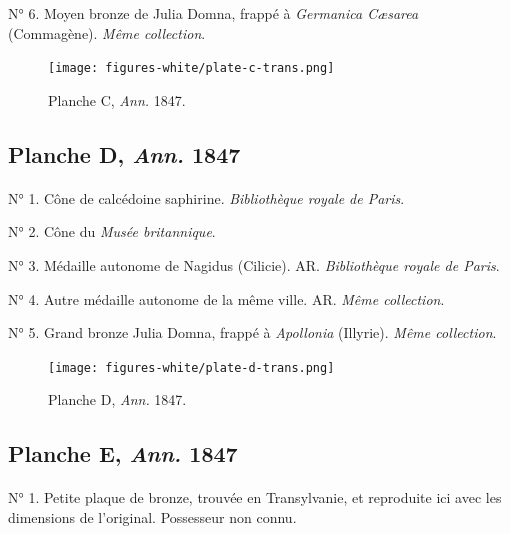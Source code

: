 \documentclass[a4paper, 11pt, oneside, polutonikogreek, french]{article}
\begin{document}
N° 6. Moyen bronze de Julia Domna, frappé à \emph{Germanica Cæsarea} (Commagène). \emph{Même collection}.
\vspace*{\fill}
\clearpage
\pagestyle{fancy}
\fancyhf{}
\cfoot{{\tiny\bfseries\thepage}}
\vspace*{\fill}
\begin{figure}[H]
\centering
\texttt{[image: figures-white/plate-c-trans.png]}
\caption{\scriptsize Planche C, \emph{Ann.} 1847.}
\end{figure}
\vspace*{\fill}
\clearpage
\pagestyle{plain}
\cfoot{{\tiny\bfseries\thepage}}
\vspace*{\fill}
\subsection{Planche D, \emph{Ann.} 1847}
\paragraph{}
N° 1. Cône de calcédoine saphirine. \emph{Bibliothèque royale de Paris}.

N° 2. Cône du \emph{Musée britannique}.

N° 3. Médaille autonome de Nagidus (Cilicie). AR. \emph{Bibliothèque royale de Paris}.

N° 4. Autre médaille autonome de la même ville. AR. \emph{Même collection}.

N° 5. Grand bronze Julia Domna, frappé à \emph{Apollonia} (Illyrie). \emph{Même collection}.
\vspace*{\fill}
\clearpage
\pagestyle{fancy}
\fancyhf{}
\cfoot{{\tiny\bfseries\thepage}}
\vspace*{\fill}
\begin{figure}[H]
\centering
\texttt{[image: figures-white/plate-d-trans.png]}
\caption{\scriptsize Planche D, \emph{Ann.} 1847.}
\end{figure}
\vspace*{\fill}
\clearpage
\pagestyle{plain}
\cfoot{{\tiny\bfseries\thepage}}
\vspace*{\fill}
\subsection{Planche E, \emph{Ann.} 1847}
\paragraph{}
N° 1. Petite plaque de bronze, trouvée en Transylvanie, et reproduite ici avec les dimensions de l'original. Possesseur non connu.
\end{document}
